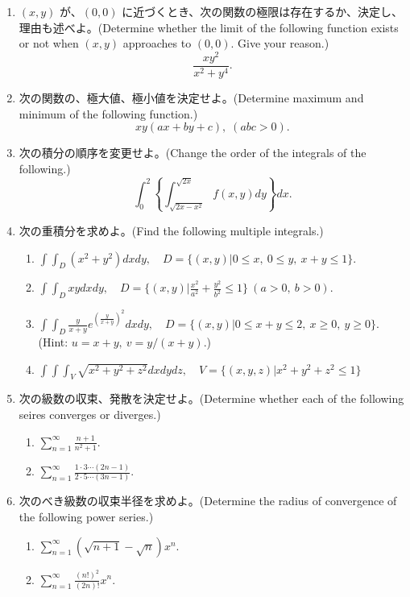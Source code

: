 \begin{enumerate}
\item $(x,y)$ が、$(0,0)$ に近づくとき、次の関数の極限は存在するか、決定し、理由も述べよ。(Determine whether the limit of the following function exists or not when $(x,y)$ approaches to $(0,0)$. Give your reason.)
$$\frac{xy^2}{x^2+y^4}.$$

\item 次の関数の、極大値、極小値を決定せよ。(Determine maximum and minimum of the following function.)
$$xy(ax+by+c), \; (abc > 0).$$

\item 次の積分の順序を変更せよ。(Change the order of the integrals of the following.)
$$\int^2_0\left\{\int^{\sqrt{2x}}_{\sqrt{2x-x^2}}f(x,y)dy\right\}dx.$$

\item 次の重積分を求めよ。(Find the following multiple integrals.)
     \begin{enumerate}
     \item $\displaystyle{\int\!\int_D (x^2+y^2)dxdy, \quad D = \{(x,y)| 0\leq x, \:0\leq y, \:x+y \leq 1\}}.$
     \item $\displaystyle{\int\!\int_D xydxdy, \quad D = \{(x,y)| \frac{x^2}{a^2}+\frac{y^2}{b^2}\leq 1\}} \:(a >0, \:b>0).$
     \item $\displaystyle{\int\!\int_D \frac{y}{x+y}e^{(\frac{y}{x+y})^2}dxdy, \quad D = \{(x,y)| 0\leq x+y \leq 2,\: x\geq 0,\: y\geq 0\}}.$\\
     (Hint: $u=x+y,\:v=y/(x+y)$.)
     \item $\displaystyle{\int\!\int\!\int_V \sqrt{x^2+y^2+z^2}dxdydz, \quad V = \{(x,y,z)| x^2+y^2+z^2\leq 1\}}$
     \end{enumerate}

\item 次の級数の収束、発散を決定せよ。(Determine whether each of the following seires converges or diverges.)
     \begin{enumerate}
     \item $\displaystyle{\sum_{n=1}^{\infty}\frac{n+1}{n^2+1}}.$
     \item $\displaystyle{\sum_{n=1}^{\infty}\frac{1\cdot 3 \cdots (2n-1)}{2\cdot 5 \cdots (3n-1)}}.$
     \end{enumerate}

\item 次のべき級数の収束半径を求めよ。(Determine the radius of convergence of the following power series.)
     \begin{enumerate}
     \item $\displaystyle{\sum_{n=1}^{\infty}(\sqrt{n+1}-\sqrt{n})x^n}.$
     \item $\displaystyle{\sum_{n=1}^{\infty}\frac{(n!)^2}{(2n)!}x^n}.$
     \end{enumerate}


\end{enumerate}
